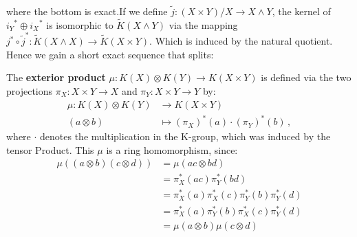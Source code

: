\begin{corollary}
\begin{center}
	\end{center} where the bottom is exact.If we define $\tilde{j}:(X\times Y)\slash X \to X\wedge Y$, the kernel of ${i_Y}^*\oplus {i_X}^*$ is isomorphic to $\tilde{K}(X\wedge Y)$ via the mapping $j^*\circ \tilde{j}^*:\tilde{K}(X\wedge X)\to \tilde{K}(X\times Y)$. Which is induced by the natural quotient. Hence we gain a short exact sequence that splits: 
	\begin{center}
	\end{center}
\end{corollary}
\begin{definition}
	The \textbf{exterior product } $\mu:K(X)\otimes K(Y)\to K(X\times Y)$ is defined via the two projections $\pi_X:X\times Y\to X$ and $\pi_Y:X\times Y\to Y$ by:
	\begin{align*}
		\mu:K(X)\otimes K(Y)&\to K(X\times Y)\\
		(a\otimes b)&\mapsto (\pi_X)^*(a)\cdot (\pi_Y)^*(b) \, ,
	\end{align*} where $\cdot$ denotes the multiplication in the K-group, which was induced by the tensor Product. This $\mu$ is a ring homomorphism, since:
	\begin{align*}
		\mu((a \otimes b)(c \otimes d)) &= \mu(ac \otimes bd) \\
		&= \pi_X^*(ac)\pi_Y^*(bd) \\
		&= \pi_X^*(a)\pi_X^*(c)\pi_Y^*(b)\pi_Y^*(d) \\
		&= \pi_X^*(a)\pi_Y^*(b)\pi_X^*(c)\pi_Y^*(d) \\
		&= \mu(a \otimes b)\mu(c \otimes d)
	\end{align*}
\end{definition}
